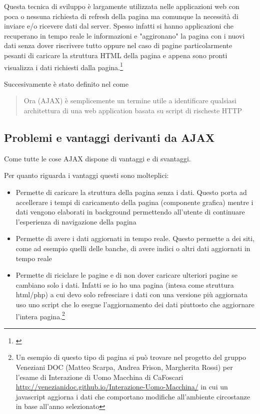 \documentclass{article}
\begin{document}
Questa tecnica di sviluppo è largamente utilizzata nelle applicazioni web con poca o nessuna richiesta di refresh della pagina ma comunque la necessità di inviare e/o ricevere dati dal server. Spesso infatti si hanno applicazioni che recuperano in tempo reale le informazioni e "aggironano" la pagina con i nuovi dati senza dover riscrivere tutto oppure nel caso di pagine particolarmente pesanti di caricare la struttura HTML della pagina e appena sono pronti visualizza i dati richiesti dalla pagina.\footnote{\cites{flanaganjavascript} }

Succesivamente è stato definito nel \textcites[pag~491]{flanaganjavascript} come 
\begin{quotation}
Ora (AJAX) è semplicemente un termine utile a identificare qualsiasi architettura di una web application basata su script di rischeste HTTP
\end{quotation}

\subsection{Problemi e vantaggi derivanti da AJAX}
Come tutte le cose AJAX dispone di vantaggi e di svantaggi.

Per quanto riguarda i vantaggi questi sono molteplici:
\begin{itemize}
\item Permette di caricare la struttura della pagina senza i dati. Questo porta ad accellerare i tempi di caricamento della pagina (componente grafica) mentre i dati vengono elaborati in background permettendo all'utente di continuare l'esperienza di navigazione della pagina
\item Permette di avere i dati aggiornati in tempo reale. Questo permette a dei siti, come ad esempio quelli delle banche, di avere indici o altri dati aggiornati in tempo reale
\item Permette di riciclare le pagine e di non dover caricare ulteriori pagine se cambiano solo i dati. Infatti se io ho una pagina (intesa come struttura html/php) a cui devo solo refresciare i dati con una versione più aggiornata uso uno script che lo esegue l'aggiornamento dei dati piuttosto che aggiornare l'intera pagina.\footnote{Un esempio di questo tipo di pagina si può trovare nel progetto del gruppo Veneziani DOC (Matteo Scarpa, Andrea Frison, Margherita Rossi) per l'esame di Interazione di Uomo Macchina di CaFoscari \url{http://venezianidoc.github.io/Interazione-Uomo-Macchina/} in cui un javascript aggiorna i dati che comportano modifiche all'ambiente circostanze in base all'anno selezionato}
\end{itemize}
\end{document}
